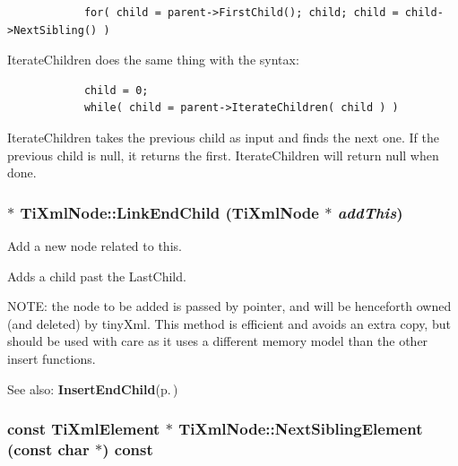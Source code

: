 \footnotesize\begin{verbatim}
			for( child = parent->FirstChild(); child; child = child->NextSibling() )
		\end{verbatim}
\normalsize


Iterate\-Children does the same thing with the syntax: 

\footnotesize\begin{verbatim}
			child = 0;
			while( child = parent->IterateChildren( child ) )
		\end{verbatim}
\normalsize


Iterate\-Children takes the previous child as input and finds the next one. If the previous child is null, it returns the first. Iterate\-Children will return null when done.
\subsubsection{ $\ast$ Ti\-Xml\-Node::Link\-End\-Child ({\bf Ti\-Xml\-Node} $\ast$ {\em add\-This})\hspace{0.3cm}{\tt  [inherited]}}\label{classTiXmlNode_TiXmlUnknowna33}


Add a new node related to this. 

Adds a child past the Last\-Child.

NOTE: the node to be added is passed by pointer, and will be henceforth owned (and deleted) by tiny\-Xml. This method is efficient and avoids an extra copy, but should be used with care as it uses a different memory model than the other insert functions.

\begin{Desc}
\item[See also:]{\bf Insert\-End\-Child}{\rm (p.\,\pageref{classTiXmlNode_TiXmlUnknowna32})}\end{Desc}
\subsubsection{\setlength{\rightskip}{0pt plus 5cm}const {\bf Ti\-Xml\-Element} $\ast$ Ti\-Xml\-Node::Next\-Sibling\-Element (const char $\ast$) const\hspace{0.3cm}{\tt  [inherited]}}\label{classTiXmlNode_TiXmlUnknowna52}



